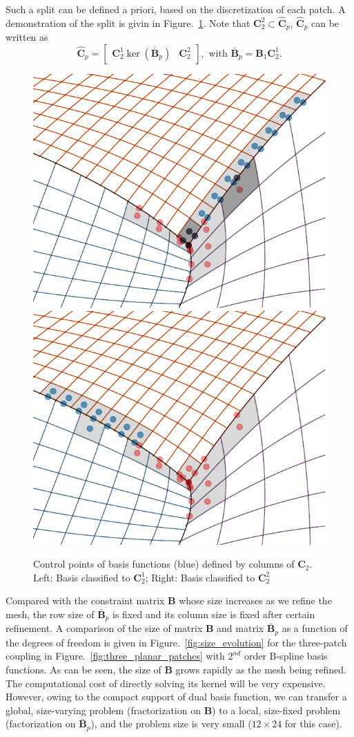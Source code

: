 \documentclass[preprint,12pt]{elsarticle}
\theoremstyle{remark}
\begin{document}
Such a split can be defined a priori, based on the discretization of each patch. A demonstration of the split is givin in Figure.~\ref{fig:overlap_nonoverlap}. Note that $\mathbf{C}_2^2\subset\hat{\mathbf{C}}_p$, $\hat{\mathbf{C}}_p$ can be written as
\begin{equation}
    \hat{\mathbf{C}}_p=
    \begin{bmatrix}
        \mathbf{C}_2^1\ker(\bar{\mathbf{B}}_p) & \mathbf{C}_2^2
    \end{bmatrix}, \text{ with } \bar{\mathbf{B}}_p=\mathbf{B}_1\mathbf{C}_2^1.\label{eq:local_kernel}
\end{equation}
\begin{figure}[hbt]
	\centering
    \includegraphics[width=.47\linewidth]{trim_overlap}
    \includegraphics[width=.47\linewidth]{trim_nonoverlap}
	\caption{Control points of basis functions (blue) defined by columns of $\mathbf{C}_2$. Left: Basis classified to $\mathbf{C}_2^1$; Right: Basis classified to $\mathbf{C}_2^2$}\label{fig:overlap_nonoverlap}
\end{figure}
Compared with the constraint matrix $\mathbf{B}$ whose size increases as we refine the mesh, the row size of $\bar{\mathbf{B}}_p$ is fixed and its column size is fixed after certain refinement. A comparison of the size of matrix $\mathbf{B}$ and matrix $\bar{\mathbf{B}}_p$ as a function of the degrees of freedom is given in Figure.~\ref{fig:size_evolution} for the three-patch coupling in Figure.~\ref{fig:three_planar_patches} with $2^{nd}$ order B-spline basis functions. As can be seen, the size of $\mathbf{B}$ grows rapidly as the mesh being refined. The computational cost of directly solving its kernel will be very expensive. However, owing to the compact support of dual basis function, we can transfer a global, size-varying problem (fractorization on $\mathbf{B}$) to a local, size-fixed problem (factorization on $\bar{\mathbf{B}}_p$), and the problem size is very small ($12\times{24}$ for this case).\par
\end{document}
